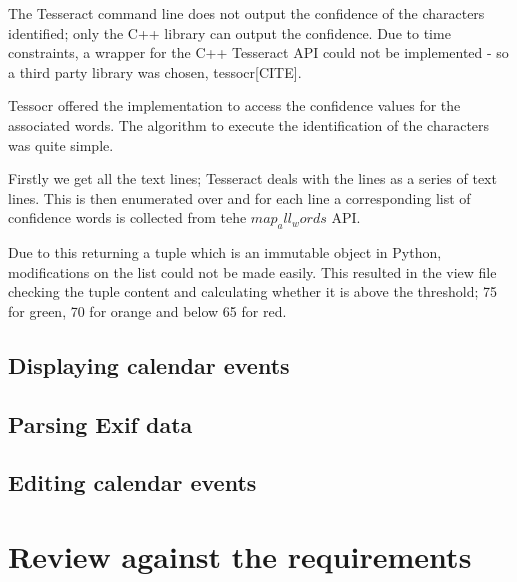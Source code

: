 The Tesseract command line does not output the confidence of the characters identified; only the C++ library can output the confidence. Due to time constraints, a wrapper for the C++ Tesseract API could not be implemented - so a third party library was chosen, tessocr[CITE].

Tessocr offered the implementation to access the confidence values for the associated words. The algorithm to execute the identification of the characters was quite simple.

Firstly we get all the text lines; Tesseract deals with the lines as a series of text lines. This is then enumerated over and for each line a corresponding list of confidence words is collected from tehe $map_all_words$ API.

Due to this returning a tuple which is an immutable object in Python, modifications on the list could not be made easily. This resulted in the view file checking the tuple content and calculating whether it is above the threshold; 75 for green, 70 for orange and below 65 for red.

\subsection{Displaying calendar events}

\subsection{Parsing Exif data}

\subsection{Editing calendar events}



\section{Review against the requirements}
